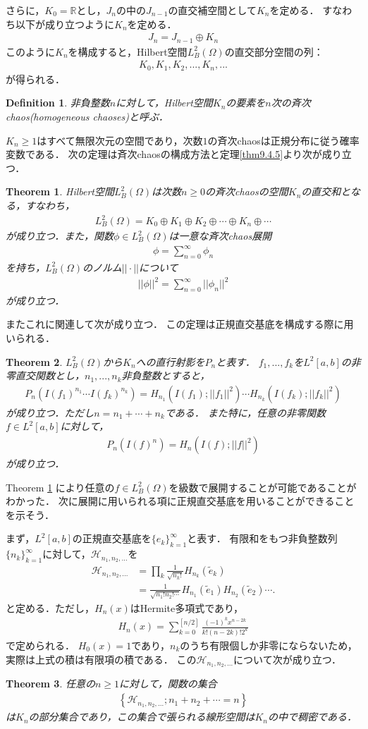 \documentclass[a4paper,10pt]{jsarticle}
\theoremstyle{plain}
\newtheorem{theorem}{Theorem}
\newtheorem{definition}{Definition}
\newcommand{\eq}[1]{\begin{align}#1\end{align}}
\begin{document}
さらに，$K_0=\mathbb{R}$とし，$J_n$の中の$J_{n-1}$の直交補空間として$K_n$を定める．
すなわち以下が成り立つように$K_n$を定める．
\eq{J_n=J_{n-1}\oplus K_n}
このように$K_n$を構成すると，Hilbert空間$L^2_B(\Omega)$の直交部分空間の列：
\eq{K_0,K_1,K_2,...,K_n,...}
が得られる．
\begin{definition}
非負整数$n$に対して，Hilbert空間$K_n$の要素を$n$次の斉次chaos(homogeneous chaoses)と呼ぶ．
\end{definition}
$K_n\ge 1$はすべて無限次元の空間であり，次数$1$の斉次chaosは正規分布に従う確率変数である．
次の定理は斉次chaosの構成方法と定理\ref{thm9.4.5}より次が成り立つ．
\begin{theorem}\label{thm9.4.7}%
Hilbert空間$L^2_B(\Omega)$は次数$n\ge0$の斉次chaosの空間$K_n$の直交和となる，すなわち，
\eq{L^2_B(\Omega)=K_0\oplus K_1\oplus K_2\oplus\cdots\oplus K_n\oplus\cdots}
が成り立つ．また，関数$\phi\in L^2_B(\Omega)$は一意な斉次chaos展開
\eq{\phi=\sum_{n=0}^\infty\phi_n}
を持ち，$L^2_B(\Omega)$のノルム$||\cdot||$について
\eq{||\phi||^2=\sum_{n=0}^\infty||\phi_n||^2}
が成り立つ．
\end{theorem}
またこれに関連して次が成り立つ．
この定理は正規直交基底を構成する際に用いられる．
\begin{theorem}\label{thm9.4.9}%
$L^2_B(\Omega)$から$K_n$への直行射影を$P_n$と表す．
$f_1,...,f_k$を$L^2[a,b]$の非零直交関数とし，$n_1,...,n_k$非負整数とすると，
\eq{P_n(I(f_1)^{n_1}\cdots I(f_k)^{n_k})=H_{n_1}(I(f_1);||f_1||^2)\cdots H_{n_k}(I(f_k);||f_k||^2)}
が成り立つ．ただし$n=n_1+\cdots+n_k$である．
また特に，任意の非零関数$f\in L^2[a,b]$に対して，
\eq{P_n(I(f)^n)=H_n(I(f);||f||^2)}
が成り立つ．
\end{theorem}

Theorem \ref{thm9.4.7} により任意の$f\in L^2_B(\Omega)$を級数で展開することが可能であることがわかった．
次に展開に用いられる項に正規直交基底を用いることができることを示そう．

まず，$L^2[a,b]$の正規直交基底を$\{e_k\}_{k=1}^\infty$と表す．
有限和をもつ非負整数列$\{n_k\}_{k=1}^\infty$に対して，$\mathcal{H}_{n_1,n_2,...}$を
\eq{\mathcal{H}_{n_1,n_2,...}
	&=\prod_k\frac{1}{\sqrt{n_k!}}H_{n_k}(\tilde{e}_k)\\
	&=\frac{1}{\sqrt{n_1!n_2!\cdots}}H_{n_1}(\tilde{e}_1)H_{n_2}(\tilde{e}_2)\cdots.}
と定める．ただし，$H_n(x)$はHermite多項式であり，
\eq{H_n(x)=\sum_{k=0}^{[n/2]}\frac{(-1)^kx^{n-2k}}{k!(n-2k)!2^k}}
で定められる．
$H_0(x)=1$であり，$n_k$のうち有限個しか非零にならないため，実際は上式の積は有限項の積である．
この$\mathcal{H}_{n_1,n_2,...}$について次が成り立つ．
\begin{theorem}\label{thm9.5.3}%
任意の$n\ge1$に対して，関数の集合
\eq{\left\{\mathcal{H}_{n_1,n_2,...};n_1+n_2+\cdots=n\right\}}
は$K_n$の部分集合であり，この集合で張られる線形空間は$K_n$の中で稠密である．
\end{theorem}
\end{document}
